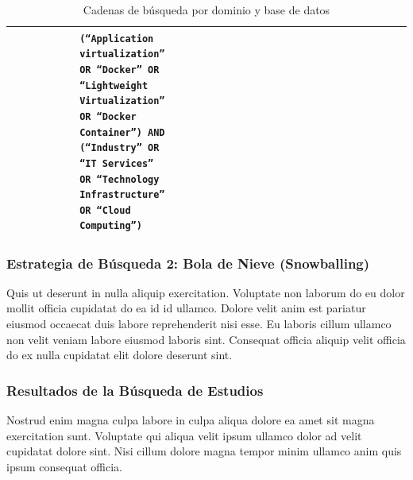 \begin{table}
\begin{adjustbox}{max width=\textwidth}
\begin{tabular}{|P{0.18\linewidth}|P{0.20\linewidth}|P{0.20\linewidth}|P{0.20\linewidth}|P{0.20\linewidth}|P{0.20\linewidth}|}
& \tiny \texttt{(``Application virtualization'' OR ``Docker'' OR ``Lightweight Virtualization'' OR ``Docker Container'') AND (``Industry'' OR ``IT Services'' OR ``Technology Infrastructure'' OR ``Cloud Computing'')} \\
\hline
\end{tabular}
\end{adjustbox}
\caption{Cadenas de búsqueda por dominio y base de datos}\label{tab:cadenas-busqueda}
\end{table}










\subsubsection{Estrategia de Búsqueda 2: Bola de Nieve (Snowballing)}
Quis ut deserunt in nulla aliquip exercitation. Voluptate non laborum do eu dolor mollit officia cupidatat do ea id id ullamco. Dolore velit anim est pariatur eiusmod occaecat duis labore reprehenderit nisi esse. Eu laboris cillum ullamco non velit veniam labore eiusmod laboris sint. Consequat officia aliquip velit officia do ex nulla cupidatat elit dolore deserunt sint.
\mbox{}\\

\subsubsection{Resultados de la Búsqueda de Estudios}
\label{subsubsec:resultados-busqueda}
Nostrud enim magna culpa labore in culpa aliqua dolore ea amet sit magna exercitation sunt. Voluptate qui aliqua velit ipsum ullamco dolor ad velit cupidatat dolore sint. Nisi cillum dolore magna tempor minim ullamco anim quis ipsum consequat officia.
\mbox{}\\